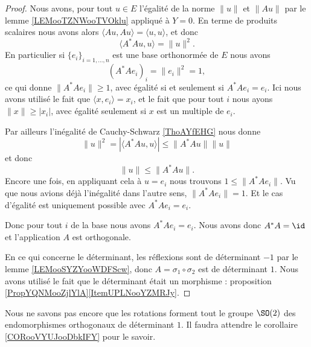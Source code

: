 \begin{proof}
    Nous avons, pour tout \( u\in E\) l'égalité de la norme \( \| u \|\) et \( \| Au \|\) par le lemme \ref{LEMooTZNWooTVOklu} appliqué à \( Y=0\). En terme de produits scalaires nous avons alors \( \langle Au, Au\rangle =\langle u, u\rangle \), et donc
    \begin{equation}
        \langle A^*Au, u\rangle =\| u \|^2.
    \end{equation}
    En particulier si \( \{ e_i \}_{i=1,\ldots, n}\) est une base orthonormée de \( E\) nous avons
    \begin{equation}
        (A^*Ae_i)_i=\| e_i \|^2=1,
    \end{equation}
    ce qui donne \( \| A^*Ae_i \|\geq 1\), avec égalité si et seulement si \( A^*Ae_i=e_i\). Ici nous avons utilisé le fait que \( \langle x, e_i\rangle =x_i\), et le fait que pour tout \( i\) nous ayons \( \| x \|\geq | x_i |\), avec égalité seulement si \( x\) est un multiple de \( e_i\).

    Par ailleurs l'inégalité de Cauchy-Schwarz \ref{ThoAYfEHG} nous donne
    \begin{equation}
        \| u \|^2=| \langle A^*Au, u\rangle  | \leq \| A^*Au \|\| u \|
    \end{equation}
    et donc
    \begin{equation}
        \| u \|\leq \| A^*Au \|.
    \end{equation}
    Encore une fois, en appliquant cela à \( u=e_i\) nous trouvons \( 1\leq \| A^*Ae_i \|\). Vu que nous avions déjà l'inégalité dans l'autre sens, \( \| A^*Ae_i \|=1\). Et le cas d'égalité est uniquement possible avec \( A^*Ae_i=e_i\).

    Donc pour tout \( i\) de la base nous avons \( A^*Ae_i=e_i\). Nous avons donc \( A^*A=\id\) et l'application \( A\) est orthogonale. 

    En ce qui concerne le déterminant, les réflexions sont de déterminant \( -1\) par le lemme \ref{LEMooSYZYooWDFScw}, donc \( A=\sigma_1\circ\sigma_2\) est de déterminant \( 1\). Nous avons utilisé le fait que le déterminant était un morphisme : proposition \ref{PropYQNMooZjlYlA}\ref{ItemUPLNooYZMRJy}.
\end{proof}

\begin{remark}
    Nous ne savons pas encore que les rotations forment tout le groupe \( \SO(2)\) des endomorphismes orthogonaux de déterminant \( 1\). Il faudra attendre le corollaire \ref{CORooVYUJooDbkIFY} pour le savoir.
\end{remark}

